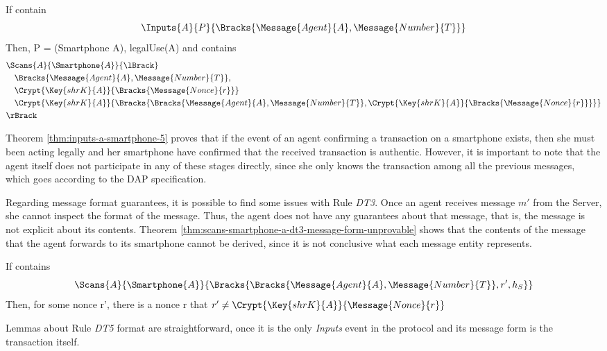 \begin{theorem}
  \label{thm:inputs-a-smartphone-5}
  If  contain
  \[\Inputs{A}{P}{\Bracks{\Message{Agent}{A}, \Message{Number}{T}}}\]
  Then, P = (Smartphone A), legalUse(A) and  contains
  \begin{align*}
    & \Scans{A}{\Smartphone{A}}{\lBrack} \\
      & \quad \Bracks{\Message{Agent}{A}, \Message{Number}{T}}, \\
      & \quad \Crypt{\Key{shrK}{A}}{\Bracks{\Message{Nonce}{r}}} \\
      & \quad \Crypt{\Key{shrK}{A}}{\Bracks{\Bracks{\Message{Agent}{A}, \Message{Number}{T}},\Crypt{\Key{shrK}{A}}{\Bracks{\Message{Nonce}{r}}}}} \\
    & \rBrack
  \end{align*}
\end{theorem}

Theorem \ref{thm:inputs-a-smartphone-5} proves that if the event of an agent confirming a transaction on a smartphone exists, then she must been acting legally and her smartphone have confirmed that the received transaction is authentic. However, it is important to note that the agent itself does not participate in any of these stages directly, since she only knows the transaction among all the previous messages, which goes according to the DAP specification.

Regarding message format guarantees, it is possible to find some issues with Rule \textit{DT3}. Once an agent receives message \(m'\) from the Server, she cannot inspect the format of the message. Thus, the agent does not have any guarantees about that message, that is, the message is not explicit about its contents. Theorem \ref{thm:scans-smartphone-a-dt3-message-form-unprovable} shows that the contents of the message that the agent forwards to its smartphone cannot be derived, since it is not conclusive what each message entity represents.

\begin{theorem}
\label{thm:scans-smartphone-a-dt3-message-form-unprovable}
  If  contains
  \[\Scans{A}{\Smartphone{A}}{\Bracks{\Bracks{\Message{Agent}{A}, \Message{Number}{T}}, r', h_S}}\]
  Then, for some nonce r', there is a nonce r that $r' \neq \Crypt{\Key{shrK}{A}}{\Message{Nonce}{r}}$
\end{theorem}

Lemmas about Rule \textit{DT5} format are straightforward, once it is the only \textit{Inputs} event in the protocol and its message form is the transaction itself.


